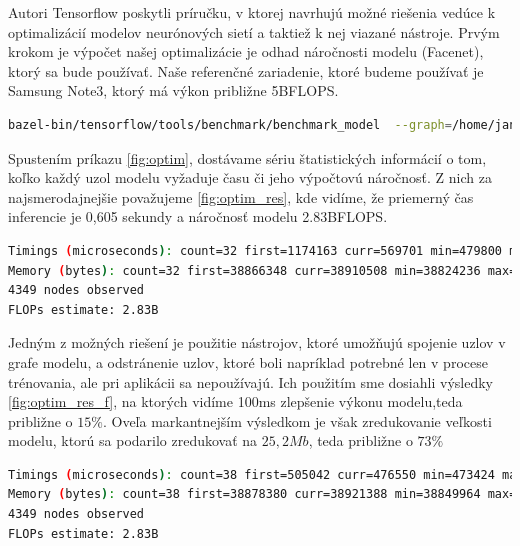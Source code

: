 \indent Autori Tensorflow poskytli príručku\cite{Optimizi3}, v ktorej navrhujú možné riešenia vedúce k optimalizácií modelov neurónových sietí a taktiež k nej viazané nástroje.
Prvým krokom je výpočet našej optimalizácie je odhad náročnosti modelu (Facenet), ktorý sa bude používať.
Naše referenčné zariadenie, ktoré budeme používať je Samsung Note3, ktorý má výkon približne 5BFLOPS. 

\begin{lstlisting}[language=Bash, label={fig:optim}, caption={Spustenie procesu analýzy modelu}]
bazel-bin/tensorflow/tools/benchmark/benchmark_model  --graph=/home/jan/models/facenet/20170512-110547.pb  --input_layer="input:0,phase_train,batch_size"  --input_layer_shape="1,160,160,3::1"  --input_layer_type="float,bool,int32"  --output_layer="embeddings:0"  --show_run_order=false  --show_time=false  --show_memory=false  --show_summary=true  --show_flops=true
\end{lstlisting}


\indent Spustením príkazu \ref{fig:optim}, dostávame sériu štatistických informácií o tom, koľko každý uzol modelu vyžaduje času či jeho výpočtovú náročnosť.
Z nich za najsmerodajnejšie považujeme \ref{fig:optim_res}, kde vidíme, že priemerný čas inferencie je 0,605 sekundy a náročnosť modelu 2.83BFLOPS.

\begin{lstlisting}[language=Bash, label={fig:optim_res}, caption={Výsledky analýzy modelu}]
Timings (microseconds): count=32 first=1174163 curr=569701 min=479800 max=1174163 avg=605828 std=138948
Memory (bytes): count=32 first=38866348 curr=38910508 min=38824236 max=39015084 avg=3.89352e+07 std=46903
4349 nodes observed
FLOPs estimate: 2.83B
\end{lstlisting}

\indent Jedným z možných riešení je použitie nástrojov, ktoré umožňujú spojenie uzlov v grafe modelu, a odstránenie uzlov, ktoré boli napríklad potrebné len v procese trénovania, ale pri aplikácii sa nepoužívajú.
Ich použitím sme dosiahli výsledky \ref{fig:optim_res_f}, na ktorých vidíme 100ms zlepšenie výkonu modelu,teda približne o $ 15\% $.
Oveľa markantnejším výsledkom je však zredukovanie veľkosti modelu, ktorú sa podarilo zredukovať na $ 25,2Mb $, teda približne o $ 73\%  $

\begin{lstlisting}[language=Bash, label={fig:optim_res_f}, caption={Výsledky analýzy modelu po optimalizácii}]
Timings (microseconds): count=38 first=505042 curr=476550 min=473424 max=676329 avg=506505 std=34466
Memory (bytes): count=38 first=38878380 curr=38921388 min=38849964 max=39028268 avg=3.89496e+07 std=47100
4349 nodes observed
FLOPs estimate: 2.83B
\end{lstlisting}

